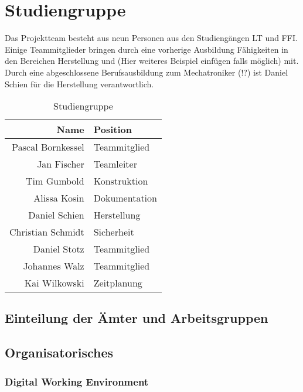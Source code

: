 \chapter{Studiengruppe}
\label{chap:Studiengruppe}
Das Projektteam besteht aus neun Personen aus den Studiengängen LT und FFI. Einige Teammitglieder bringen durch eine vorherige Ausbildung Fähigkeiten in den Bereichen Herstellung und (Hier weiteres Beispiel einfügen falls möglich) mit. Durch eine abgeschlossene Berufsausbildung zum Mechatroniker (!?) ist Daniel Schien für die Herstellung verantwortlich.
\begin{table}[htb]
	\centering
	\caption{Studiengruppe}
	\label{tab:Studiengruppe_Aemter}
	\begin{tabular}{rl}
		\textbf{Name} & \textbf{Position}\\
		\toprule
		Pascal Bornkessel & Teammitglied \\
		Jan Fischer & Teamleiter \\
		Tim Gumbold & Konstruktion \\
		Alissa Kosin & Dokumentation \\
		Daniel Schien & Herstellung \\
		Christian Schmidt & Sicherheit \\
		Daniel Stotz & Teammitglied \\
		Johannes Walz & Teammitglied \\
		Kai Wilkowski & Zeitplanung \\
	\end{tabular}
	
\end{table}

\section{Einteilung der Ämter und Arbeitsgruppen}

\section{Organisatorisches}

\subsection{Digital Working Environment}